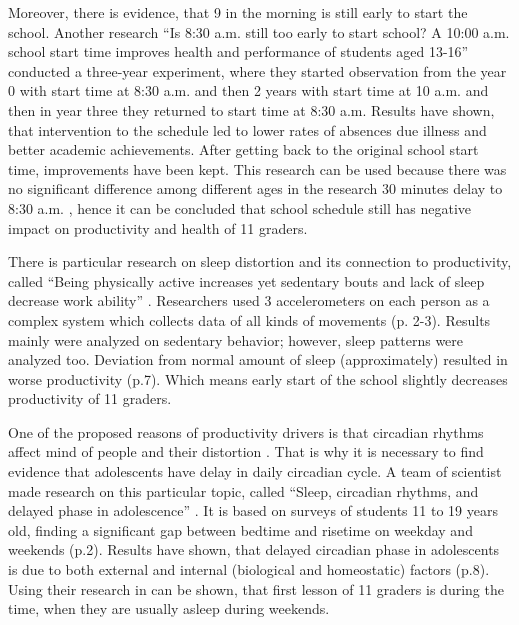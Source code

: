 \documentclass[12pt,a4paper,stu, donotrepeattitle, floatsintext]{apa7}
\begin{document}
Moreover, there is evidence, that 9 in the morning is still early to start the school. Another research “Is 8:30 a.m. still too early to start school? A 10:00 a.m. school start time improves health and performance of students aged 13-16” \cite{Kelley2017} conducted a three-year experiment, where they started observation from the year 0 with start time at 8:30 a.m. and then 2 years with start time at 10 a.m. and then in year three they returned to start time at 8:30 a.m. Results have shown, that intervention to the schedule led to lower rates of absences due illness and better academic achievements. After getting back to the original school start time, improvements have been kept. This research can be used because there was no significant difference among different ages in the research 30 minutes delay to 8:30 a.m. \cite{Owens2010}, hence it can be concluded that school schedule still has negative impact on productivity and health of 11 graders.

There is particular research on sleep distortion and its connection to productivity, called “Being physically active increases yet sedentary bouts and lack of sleep decrease work ability” \cite{Giurgiu2021}. Researchers used 3 accelerometers on each person as a complex system which collects data of all kinds of movements (p. 2-3). Results mainly were analyzed on sedentary behavior; however, sleep patterns were analyzed too. Deviation from normal amount of sleep (approximately) resulted in worse productivity (p.7). Which means early start of the school slightly decreases productivity of 11 graders.

One of the proposed reasons of productivity drivers is that circadian rhythms affect mind of people and their distortion \cite{Carell2018}. That is why it is necessary to find evidence that adolescents have delay in daily circadian cycle. A team of scientist made research on this particular topic, called “Sleep, circadian rhythms, and delayed phase in adolescence” \cite{CROWLEY2007602}. It is based on surveys of students 11 to 19 years old, finding a significant gap between bedtime and risetime on weekday and weekends (p.2). Results have shown, that delayed circadian phase in adolescents is due to both external and internal (biological and homeostatic) factors (p.8). Using their research in can be shown, that first lesson of 11 graders is during the time, when they are usually asleep during weekends.
\end{document}
